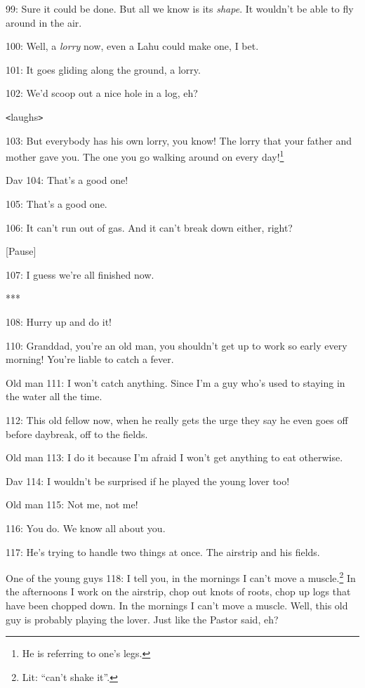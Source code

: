 99: Sure it could be done. But all we know is its \textit{shape}. It wouldn't be
able to fly around in the air.

100: Well, a \textit{lorry }now, even a Lahu could make one, I bet.

101: It goes gliding along the ground, a lorry.

102: We'd scoop out a nice hole in a log, eh?

\texttt{<}laughs\texttt{>}

103: But everybody has his own lorry, you know! The lorry that your father and
mother gave you. The one you go walking around on every day!\footnote{He is referring to one's legs.}

Dav 104: That's a good one!

105: That's a good one.

106: It can't run out of gas. And it can't break down either, right?

\begin{center}
[Pause]
\end{center}

\leftskip=0pt
107: I guess we're all finished now.

\begin{center}
***
\end{center}

\leftskip=0pt
108: Hurry up and do it!

110: Granddad, you're an old man, you shouldn't get up to work so early every morning!
You're liable to catch a fever.

Old man 111: I won't catch anything. Since I'm a guy who's used to staying in the
water all the time.

112: This old fellow now, when he really gets the urge they say he even goes off
before daybreak, off to the fields.

Old man 113: I do it because I'm afraid I won't get anything to eat otherwise.

Dav 114: I wouldn't be surprised if he played the young lover too!

Old man 115: Not me, not me!

116: You do. We know all about you.

117: He's trying to handle two things at once. The airstrip and his fields.

One of the young guys 118: I tell you, in the mornings I can't move a muscle.\footnote{Lit: ``can't shake it''.}
In the afternoons I work on the airstrip, chop out knots of roots, chop up logs
that have been chopped down. In the mornings I can't move a muscle. Well, this
old guy is probably playing the lover. Just like the Pastor said, eh?

